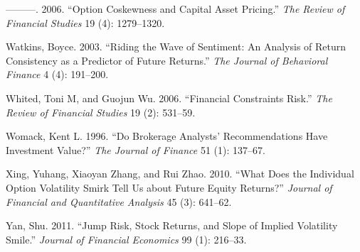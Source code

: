 \documentclass[
  letterpaper,
  DIV=11,
  numbers=noendperiod]{scrreprt}
\newlength{\cslhangindent}
\newlength{\cslentryspacingunit} %
\newenvironment{CSLReferences}[2] %
 {%
  \setlength{\parindent}{0pt}
  \ifodd #1
  \let\oldpar\par
  \def\par{\hangindent=\cslhangindent\oldpar}
  \fi
  \setlength{\parskip}{#2\cslentryspacingunit}
 }%
 {}
\begin{document}
\begin{CSLReferences}{1}{0}
\leavevmode{}%
---------. 2006. {``Option Coskewness and Capital Asset Pricing.''}
\emph{The Review of Financial Studies} 19 (4): 1279--1320.

\leavevmode{}%
Watkins, Boyce. 2003. {``Riding the Wave of Sentiment: An Analysis of
Return Consistency as a Predictor of Future Returns.''} \emph{The
Journal of Behavioral Finance} 4 (4): 191--200.

\leavevmode{}%
Whited, Toni M, and Guojun Wu. 2006. {``Financial Constraints Risk.''}
\emph{The Review of Financial Studies} 19 (2): 531--59.

\leavevmode{}%
Womack, Kent L. 1996. {``Do Brokerage Analysts' Recommendations Have
Investment Value?''} \emph{The Journal of Finance} 51 (1): 137--67.

\leavevmode{}%
Xing, Yuhang, Xiaoyan Zhang, and Rui Zhao. 2010. {``What Does the
Individual Option Volatility Smirk Tell Us about Future Equity
Returns?''} \emph{Journal of Financial and Quantitative Analysis} 45
(3): 641--62.

\leavevmode{}%
Yan, Shu. 2011. {``Jump Risk, Stock Returns, and Slope of Implied
Volatility Smile.''} \emph{Journal of Financial Economics} 99 (1):
216--33.

\end{CSLReferences}
\end{document}

